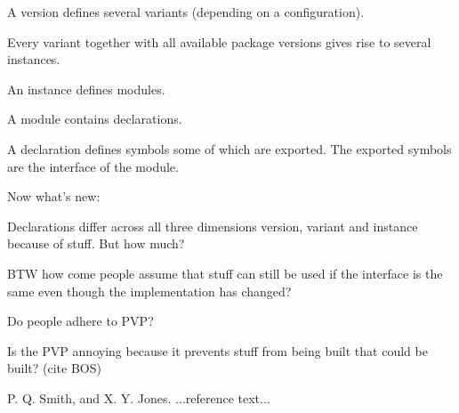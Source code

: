 \documentclass[preprint]{sigplanconf}
\begin{document}
A version defines several variants (depending on a configuration).

Every variant together with all available package versions gives rise to several instances.

An instance defines modules.

A module contains declarations.

A declaration defines symbols some of which are exported. The exported symbols are the interface of the module.

Now what's new:

Declarations differ across all three dimensions version, variant and instance because of stuff. But how much?

BTW how come people assume that stuff can still be used if the interface is the same even though the implementation has changed?

Do people adhere to PVP?

Is the PVP annoying because it prevents stuff from being built that could be built? (cite BOS)











\begin{thebibliography}{}
\softraggedright

P. Q. Smith, and X. Y. Jones. ...reference text...

\end{thebibliography}
\end{document}
